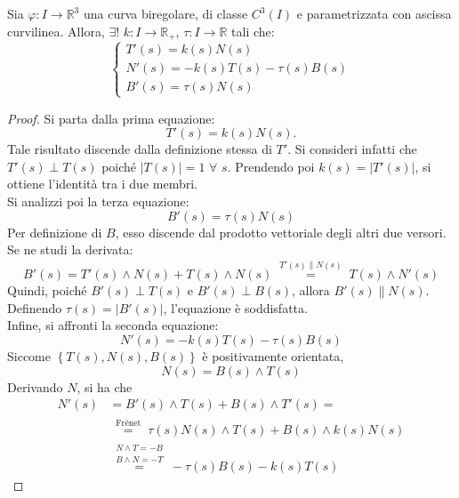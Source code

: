 \begin{theorem} \label{Teo: Formule di Frénet}
    Sia $\varphi: I \to \mathbb{R}^3$ una curva biregolare, di classe $C^3(I)$ e parametrizzata con ascissa curvilinea. Allora, $\exists!$ $k:I\to \mathbb{R}_+$, $\tau:I\to\mathbb{R}$ tali che:
    \begin{equation}
        \begin{cases}
            T'(s)=k(s)N(s)\\
            N'(s)=-k(s)T(s)-\tau(s)B(s)\\
            B'(s)=\tau(s)N(s)
        \end{cases}
    \end{equation}
    \end{theorem}
    \begin{proof}
        Si parta dalla prima equazione: 
        \begin{equation}
            T'(s)=k(s)N(s).        
        \end{equation}
        Tale risultato discende dalla definizione stessa di $T'$. Si consideri infatti che $T'(s)\perp T(s)$ poiché $|T(s)|=1$ $\forall$ $s$. Prendendo poi $k(s)=|T'(s)|$, si ottiene l'identità tra i due membri.\\
        Si analizzi poi la terza equazione:
        \begin{equation}
            B'(s)=\tau(s)N(s)
        \end{equation}
        Per definizione di $B$, esso discende dal prodotto vettoriale degli altri due versori. Se ne studi la derivata:
        \begin{equation}
            B'(s)=T'(s)\wedge N(s) + T(s) \wedge N(s) \overset{\substack{T'(s)\parallel N(s)}}{=} T(s)\wedge N'(s)
        \end{equation}
        Quindi, poiché $B'(s)\perp T(s)$ e $B'(s) \perp B(s)$, allora $B'(s) \parallel N(s)$. Definendo $\tau(s)=|B'(s)|$, l'equazione è soddisfatta.\\
        Infine, si affronti la seconda equazione:
        \begin{equation}
            N'(s)= -k(s)T(s)- \tau(s)B(s)
        \end{equation}
        Siccome $\left\{T(s), N(s), B(s)\right\}$ è positivamente orientata,
        \begin{equation}
            N(s)=B(s) \wedge T(s)
        \end{equation}
        Derivando $N$, si ha che
        \begin{equation}
            \begin{aligned}
                N'(s)&=B'(s)\wedge T(s) + B(s) \wedge T'(s)=\\
                &\overset{\substack{\text{Frénet}}}{=} \tau(s)N(s)\wedge T(s) + B(s) \wedge k(s)N(s)\\
                &\overset{\substack{N \wedge T = -B\\B \wedge N =-T}}{=} -\tau(s)B(s)- k(s)T(s)
            \end{aligned}
        \end{equation}
    \end{proof}
